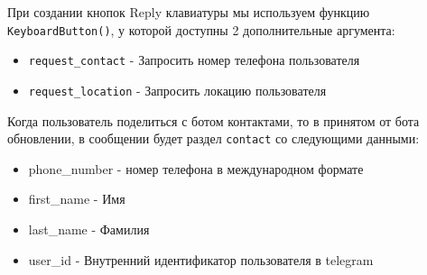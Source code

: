 \documentclass[
]{book}
\newenvironment{Shaded}{\begin{snugshade}}{\end{snugshade}}
\newcommand{\AttributeTok}[1]{\textcolor[rgb]{0.13,0.29,0.53}{#1}}
\newcommand{\CommentTok}[1]{\textcolor[rgb]{0.56,0.35,0.01}{\textit{#1}}}
\newcommand{\ConstantTok}[1]{\textcolor[rgb]{0.56,0.35,0.01}{#1}}
\newcommand{\FunctionTok}[1]{\textcolor[rgb]{0.13,0.29,0.53}{\textbf{#1}}}
\newcommand{\NormalTok}[1]{#1}
\newcommand{\OtherTok}[1]{\textcolor[rgb]{0.56,0.35,0.01}{#1}}
\newcommand{\SpecialCharTok}[1]{\textcolor[rgb]{0.81,0.36,0.00}{\textbf{#1}}}
\newcommand{\StringTok}[1]{\textcolor[rgb]{0.31,0.60,0.02}{#1}}
\providecommand{\tightlist}{%
  \setlength{\itemsep}{0pt}\setlength{\parskip}{0pt}}
\begin{document}
При создании кнопок Reply клавиатуры мы используем функцию \texttt{KeyboardButton()}, у которой доступны 2 дополнительные аргумента:

\begin{itemize}
\tightlist
\item
  \texttt{request\_contact} - Запросить номер телефона пользователя
\item
  \texttt{request\_location} - Запросить локацию пользователя
\end{itemize}

\begin{Shaded}
\end{Shaded}

Когда пользователь поделиться с ботом контактами, то в принятом от бота обновлении, в сообщении будет раздел \texttt{contact} со следующими данными:

\begin{itemize}
\tightlist
\item
  phone\_number - номер телефона в международном формате
\item
  first\_name - Имя
\item
  last\_name - Фамилия
\item
  user\_id - Внутренний идентификатор пользователя в telegram
\end{itemize}
\end{document}
